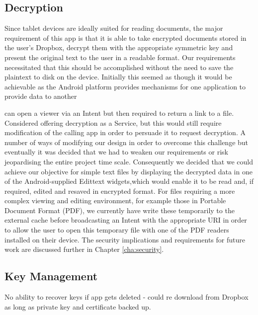 \subsection*{Decryption }
Since tablet devices are ideally suited for reading documents, the major requirement of this app is that it is able to take encrypted documents stored in the user's Dropbox,  decrypt them with the appropriate symmetric key and present the original text to the user in a readable format.  Our requirements necessitated that this should be accomplished without the need to save the plaintext to disk on the device.  Initially this seemed as though it would be achievable as the Android platform provides mechanisms for one application to provide data to another


can open a viewer via an Intent but then required to return a link to a file.  Considered offering decryption as a Service, but this would still require modification of the calling app in order to persuade it to request decryption.  A number of ways of modifying our design in order to overcome this challenge but eventually it was decided that we had to weaken our requirements or risk jeopardising the entire project time scale.  Consequently we decided that we could achieve our objective for simple text files by displaying the decrypted data in one of the Android-supplied Edittext widgets,which would enable it to be read and, if required, edited and resaved in encrypted format.  For files requiring a more complex viewing and editing environment, for example those in Portable Document Format (PDF), we currently have write these temporarily to the external cache before broadcasting an Intent with the appropriate URI in order to allow the user to open this temporary file with one of the PDF readers installed on their device.  The security implications and requirements for future work are discussed further in Chapter \ref{cha:security}.




\subsection*{Key Management }
No ability to recover keys if app gets deleted - could re download from Dropbox as long as private key and certificate backed up. 


